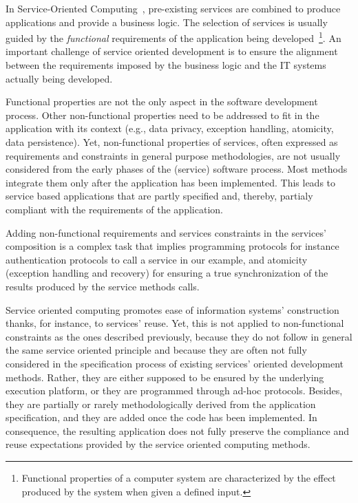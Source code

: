 




In Service-Oriented Computing~\cite{Papazoglou2007}, pre-existing services are
combined to produce applications and provide a business logic.
The selection of services is usually guided by the \textit{functional} requirements of the application being developed~\cite{1,2,decastro1,PapazoglouH06}\footnote{Functional properties of a computer system are characterized by the effect produced by the system when given a defined input.}.
An important challenge of service oriented development is  to ensure the alignment between the requirements imposed by the business logic and the IT systems actually being developed.

Functional properties are not the only  aspect in the software development process.
Other non-functional properties need to be addressed to fit in the application with its context (e.g., data privacy, exception handling, atomicity, data persistence).
Yet, non-functional properties of  services, often expressed as requirements and constraints in general purpose methodologies, are not usually considered from the early phases of the (service) software process.
Most methods integrate them only after the application has been implemented.
This leads to service based applications that are partly specified and, thereby, partialy compliant with the requirements of the application.

Adding non-functional requirements and services constraints in the services' composition is a complex task that implies programming  protocols for instance authentication protocols to call a service in our example, and atomicity (exception handling and recovery) for ensuring a true synchronization of the results produced by the service methods calls.

Service oriented computing promotes ease of information systems' construction thanks, for instance, to services' reuse. Yet, this is not applied to non-functional constraints as the ones described previously, because they do not follow in general the same service oriented principle and because they are often not fully considered in the specification process of existing services' oriented development methods. Rather, they   are either supposed to be ensured by the underlying execution platform, or they are programmed through ad-hoc protocols. Besides,  they are partially or rarely methodologically derived from the application specification, and they are added once the code has been implemented. In consequence, the resulting application does not fully preserve the compliance and reuse expectations provided by the service oriented computing methods.

